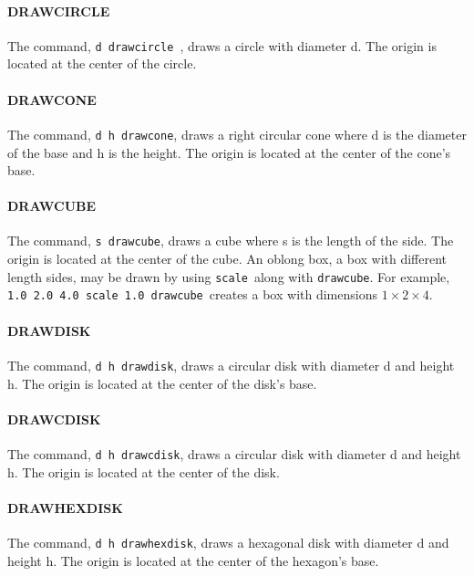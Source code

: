 \documentclass[11pt,twoside]{book}
\begin{document}
\paragraph{DRAWCIRCLE} The command, {\tt d drawcircle },
draws a circle with diameter d.  The origin is located at the center of the circle.

\paragraph{DRAWCONE}
The command, {\tt d h drawcone}, draws a right circular cone where
d is the diameter of the base and h is the height. The origin is
located at the center of the cone's base.

\paragraph{DRAWCUBE} The command, {\tt s drawcube},
draws a cube where s is the length of the side.  The origin is
located at the center of the cube.  An oblong box, a box with
different length sides, may be drawn by using {\tt scale}\ along
with {\tt drawcube}.  For example, {\tt 1.0 2.0 4.0 scale 1.0
drawcube}\ creates a box with dimensions $1\times 2\times 4$.

\paragraph{DRAWDISK} The command, {\tt d h drawdisk},
draws a circular disk with diameter d and height h. The origin is
located at the center of the disk's base.\vspace{0.25in}

\paragraph{DRAWCDISK} The command, {\tt d h drawcdisk},
draws a circular disk with diameter d and height h. The origin is
located at the center of the disk.\vspace{0.25in}

\paragraph{DRAWHEXDISK} The command, {\tt d h drawhexdisk},
draws a hexagonal disk with diameter d and height h.  The origin
is located at the center of the hexagon's base.
\end{document}
